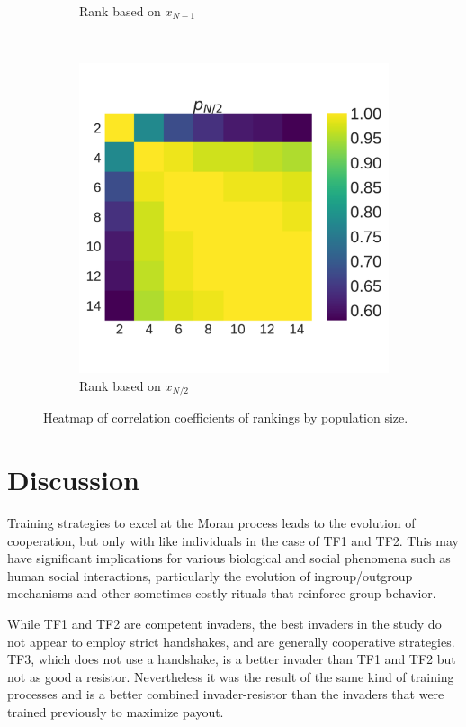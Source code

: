 \documentclass[10pt,letterpaper]{article}
\begin{document}
\begin{figure}[!htbp]
\begin{subfigure}[t]{.3\columnwidth}
        \caption{Rank based on \(x_{N - 1}\)}
    \end{subfigure}
    ~
    \begin{subfigure}[t]{.3\columnwidth}
        \centering
        \includegraphics[width=\columnwidth]{./correlation_heatmap_coexist.pdf}
        \caption{Rank based on \(x_{N/2}\)}
    \end{subfigure}
    \caption{Heatmap of correlation coefficients of rankings by population size.}
    \label{fig:correlation_coefficients}
\end{figure}


\section*{Discussion}

Training strategies to excel
at the Moran process leads to the evolution of cooperation, but only with like
individuals in the case of TF1 and TF2. This may have significant implications
for various biological and social phenomena such as
human social interactions, particularly the evolution of ingroup/outgroup mechanisms
and other sometimes costly rituals that reinforce group behavior.

While TF1 and TF2 are competent invaders, the best invaders
in the study do not appear to employ strict handshakes, and are generally
cooperative strategies. TF3, which does not use a handshake, is a better invader
than TF1 and TF2 but not as good a resistor. Nevertheless it was the result
of the same kind of training processes and is a better combined invader-resistor
than the invaders that were trained previously to maximize payout.
\end{document}
